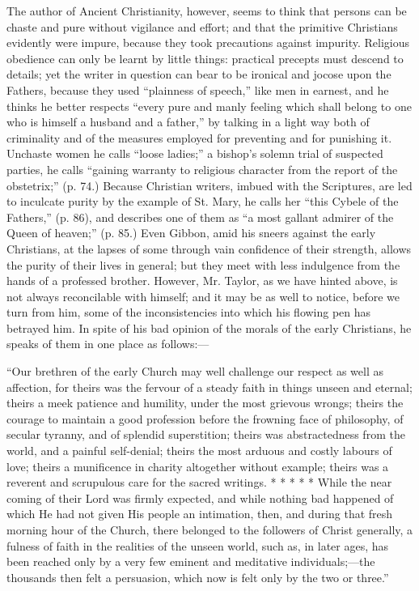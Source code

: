 The author of Ancient Christianity, however, seems
to think that persons can be chaste and pure without vigilance and
effort; and that the primitive Christians evidently were impure, because
they took precautions against impurity. Religious obedience can only be
learnt by little things: practical precepts must descend to details; yet
the writer in question can bear to be ironical and jocose upon the
Fathers, because they used ``plainness of speech,'' like men in earnest,
and he thinks he better respects ``every pure and manly feeling which
shall belong to one who is himself a husband and a father,'' by talking
in a light way both of criminality and of the measures employed for
preventing and for punishing it. Unchaste women he calls ``loose ladies;''
a bishop's solemn trial of suspected parties, he calls ``gaining warranty
to religious character from the report of the obstetrix;'' (p. 74.)
Because Christian writers, imbued with the Scriptures, are led to
inculcate purity by the example of St. Mary, he calls her ``this Cybele
of the Fathers,'' (p. 86), and describes one of them as ``a most gallant
admirer of the Queen of heaven;'' (p. 85.) Even Gibbon, amid his sneers
against the early Christians, at the lapses of some through vain
confidence of their strength, allows the purity of their lives in
general; but they meet with less indulgence from the hands of a
professed brother. However, Mr. Taylor, as we have hinted above, is not
always reconcilable with himself; and it may be as well to notice,
before we turn from him, some of the inconsistencies into which his
flowing pen has betrayed him. In spite of his bad opinion of the morals
of the early Christians, he speaks of them in one place as follows:—

``Our brethren of the early Church may well
challenge our respect as well as affection, for theirs was the fervour
of a steady faith in things unseen and eternal; theirs a meek patience
and humility, under the most grievous wrongs; theirs the courage to
maintain a good profession before the frowning face of philosophy, of
secular tyranny, and of splendid superstition; theirs was abstractedness
from the world, and a painful self-denial; theirs the most arduous and
costly labours of love; theirs a munificence in charity altogether
without example; theirs was a reverent and scrupulous care for the
sacred writings. *
* *
* * While
the near coming of their Lord was firmly expected, and while nothing bad
happened of which He had not given His people an intimation, then, and
during that fresh morning hour of the Church, there belonged to the
followers of Christ generally, a fulness of faith in the realities of
the unseen world, such as, in later ages, has been reached only by a
very few eminent and meditative individuals;—the thousands then felt a
persuasion, which now is felt only by the two or three.''

